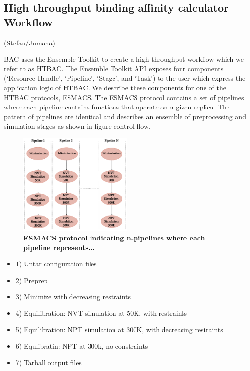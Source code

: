 \subsection{High throughput binding affinity calculator Workflow}

(Stefan/Jumana)

BAC uses the Ensemble Toolkit to create a high-throughput workflow which we refer to as HTBAC. The Ensemble Toolkit API exposes four components (‘Resource Handle’, ‘Pipeline’, ‘Stage’, and ‘Task') to the user which express the application logic of HTBAC. We describe these components for one of the HTBAC protocols, ESMACS. The ESMACS protocol contains a set of pipelines where each pipeline contains functions that operate on a given replica. The pattern of pipelines are identical and describes an ensemble of preprocessing and simulation stages as shown in figure control-flow. 


\begin{figure}[tb]
\centering
  \includegraphics[width=0.5\textwidth]{FIGURES/HT-BAC-NAMD-pipelines-control-flow-only.pdf}
  \caption{\bf ESMACS protocol indicating n-pipelines where each pipeline represents...}
   \label{figure:ESMACS-pipelines}
\end{figure}

\begin{itemize}
	\item 1) Untar configuration files
	\item 2) Preprep
	\item 3) Minimize with decreasing restraints
	\item 4) Equilibration: NVT simulation at 50K, with restraints
	\item 5) Equilibration: NPT simulation at 300K, with decreasing restraints 
	\item 6) Equlibratin: NPT at 300k, no constraints
	\item 7) Tarball output files 
\end{itemize}

